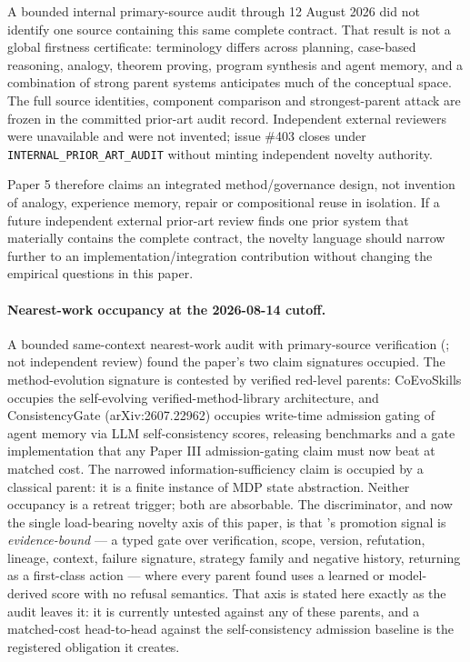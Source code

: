 A bounded internal primary-source audit through 12 August 2026 did not identify one source containing this same complete contract. That result is not a global firstness certificate: terminology differs across planning, case-based reasoning, analogy, theorem proving, program synthesis and agent memory, and a combination of strong parent systems anticipates much of the conceptual space. The full source identities, component comparison and strongest-parent attack are frozen in the committed prior-art audit record. Independent external reviewers were unavailable and were not invented; issue \#403 closes under \texttt{INTERNAL\_PRIOR\_ART\_AUDIT} without minting independent novelty authority.

Paper 5 therefore claims an integrated method/governance design, not invention of analogy, experience memory, repair or compositional reuse in isolation. If a future independent external prior-art review finds one prior system that materially contains the complete contract, the novelty language should narrow further to an implementation/integration contribution without changing the empirical questions in this paper.

\paragraph{Nearest-work occupancy at the 2026-08-14 cutoff.}
A bounded same-context nearest-work audit with primary-source verification (; not independent review) found the paper's two claim signatures occupied. The method-evolution signature is contested by verified red-level parents: CoEvoSkills occupies the self-evolving verified-method-library architecture, and ConsistencyGate (arXiv:2607.22962) occupies write-time admission gating of agent memory via LLM self-consistency scores, releasing benchmarks and a gate implementation that any Paper III admission-gating claim must now beat at matched cost. The narrowed information-sufficiency claim is occupied by a classical parent: it is a finite instance of MDP state abstraction. Neither occupancy is a retreat trigger; both are absorbable. The discriminator, and now the single load-bearing novelty axis of this paper, is that \RAKL{}'s promotion signal is \emph{evidence-bound} --- a typed gate over verification, scope, version, refutation, lineage, context, failure signature, strategy family and negative history, returning \CANNOTCHECK{} as a first-class action --- where every parent found uses a learned or model-derived score with no refusal semantics. That axis is stated here exactly as the audit leaves it: it is currently untested against any of these parents, and a matched-cost head-to-head against the self-consistency admission baseline is the registered obligation it creates.

